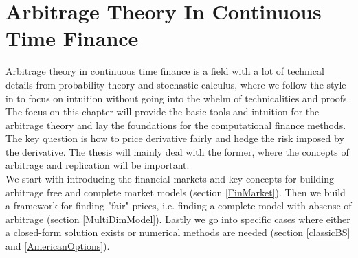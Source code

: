 
\chapter{Arbitrage Theory In Continuous Time Finance} %

\label{Chapter2} %

Arbitrage theory in continuous time finance is a field with a lot of technical details from probability theory and stochastic calculus, where we follow the style in \parencite{Hull, finKont} to focus on intuition without going into the whelm of technicalities and proofs. The focus on this chapter will provide the basic tools and intuition for the arbitrage theory and lay the foundations for the computational finance methods. The key question is how to price derivative fairly and hedge the risk imposed by the derivative. The thesis will mainly deal with the former, where the concepts of arbitrage and replication will be important.\\

We start with introducing the financial markets and key concepts for building arbitrage free and complete market models (section \ref{FinMarket}). Then we build a framework for finding "fair" prices, i.e. finding a complete model with absense of arbitrage (section \ref{MultiDimModel}). Lastly we go into specific cases where either a closed-form solution exists or numerical methods are needed (section \ref{classicBS} and \ref{AmericanOptions}).


